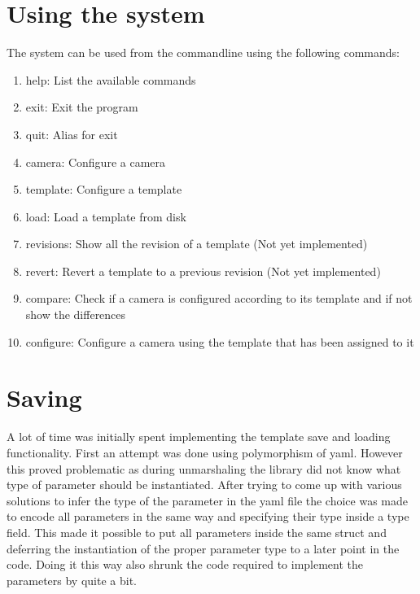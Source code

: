 

\section{Using the system}
The system can be used from the commandline using the following commands:
\begin{enumerate}
	\item help: List the available commands
	\item exit: Exit the program
	\item quit: Alias for exit
	\item camera: Configure a camera
	\item template: Configure a template
	\item load: Load a template from disk
	\item revisions: Show all the revision of a template (Not yet implemented)
	\item revert: Revert a template to a previous revision (Not yet implemented)
	\item compare: Check if a camera is configured according to its template and if not show the differences
	\item configure: Configure a camera using the template that has been assigned to it
\end{enumerate}

\section{Saving}
A lot of time was initially spent implementing the template save and loading functionality.
First an attempt was done using polymorphism of yaml. However this proved problematic as during unmarshaling the library did not know what type of parameter should be instantiated.
After trying to come up with various solutions to infer the type of the parameter in the yaml file the choice was made to encode all parameters in the same way and specifying their type inside a type field.
This made it possible to put all parameters inside the same struct and deferring the instantiation of the proper parameter type to a later point in the code.
Doing it this way also shrunk the code required to implement the parameters by quite a bit.

